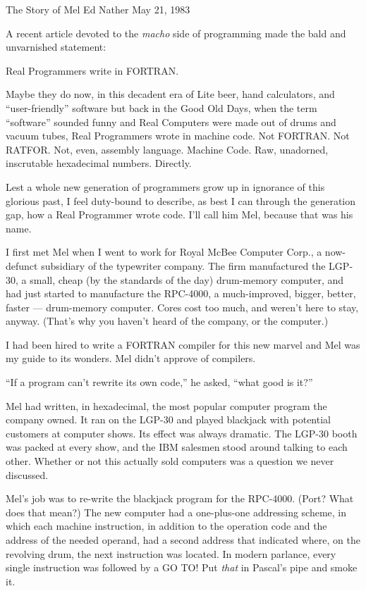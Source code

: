 \documentclass[12pt]{article}
\begin{document}
\noindent
The Story of Mel\newline
Ed Nather\newline
May 21, 1983

\bigskip
\noindent
A recent article devoted to the {\it macho} side of programming
made the bald and unvarnished statement:

\bigskip
\noindent
Real Programmers write in FORTRAN.

\bigskip
\noindent
Maybe they do now,
in this decadent era of
Lite beer, hand calculators, and ``user-friendly'' software
but back in the Good Old Days,
when the term ``software'' sounded funny
and Real Computers were made out of drums and vacuum tubes,
Real Programmers wrote in machine code.
Not FORTRAN.  Not RATFOR.  Not, even, assembly language.
Machine Code.
Raw, unadorned, inscrutable hexadecimal numbers.
Directly.

\bigskip
\noindent
Lest a whole new generation of programmers
grow up in ignorance of this glorious past,
I feel duty-bound to describe,
as best I can through the generation gap,
how a Real Programmer wrote code.
I'll call him Mel,
because that was his name.

\bigskip
\noindent
I first met Mel when I went to work for Royal McBee Computer Corp.,
a now-defunct subsidiary of the typewriter company.
The firm manufactured the LGP-30,
a small, cheap (by the standards of the day)
drum-memory computer,
and had just started to manufacture
the RPC-4000, a much-improved,
bigger, better, faster --- drum-memory computer.
Cores cost too much,
and weren't here to stay, anyway.
(That's why you haven't heard of the company,
or the computer.)

\bigskip
\noindent
I had been hired to write a FORTRAN compiler
for this new marvel and Mel was my guide to its wonders.
Mel didn't approve of compilers.

\bigskip
\noindent
``If a program can't rewrite its own code,''
he asked, ``what good is it?''

\bigskip
\noindent
Mel had written,
in hexadecimal,
the most popular computer program the company owned.
It ran on the LGP-30
and played blackjack with potential customers
at computer shows.
Its effect was always dramatic.
The LGP-30 booth was packed at every show,
and the IBM salesmen stood around
talking to each other.
Whether or not this actually sold computers
was a question we never discussed.

\bigskip
\noindent
Mel's job was to re-write
the blackjack program for the RPC-4000.
(Port?  What does that mean?)
The new computer had a one-plus-one
addressing scheme,
in which each machine instruction,
in addition to the operation code
and the address of the needed operand,
had a second address that indicated where, on the revolving drum,
the next instruction was located.
In modern parlance,
every single instruction was followed by a GO TO!
Put {\it that} in Pascal's pipe and smoke it.
\end{document}
